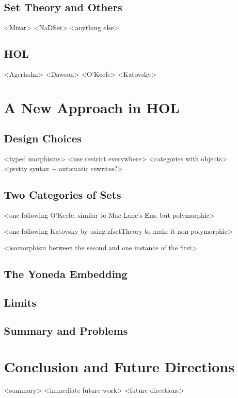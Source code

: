 \documentclass[twoside,titlepage,11pt]{article}
\begin{document}
\subsection{Set Theory and Others}%
  <Mizar>%
  <NaDSet>%
  <anything else>%
\subsection{HOL}%
  <Agerholm>%
  <Dawson>%
  <O'Keefe>%
  <Katovsky>%
\section{A New Approach in HOL}%
\subsection{Design Choices}%
<typed morphisms>
<use restrict everywhere>
<categories with objects>
<pretty syntax + automatic rewrites?>
\subsection{Two Categories of Sets}%
<one following O'Keefe, similar to Mac Lane's Ens, but polymorphic>

<one following Katovsky by using zfsetTheory to make it non-polymorphic>

<isomorphism between the second and one instance of the first>
\subsection{The Yoneda Embedding}%
\subsection{Limits}%
\subsection{Summary and Problems}%
\section{Conclusion and Future Directions}%
<summary>%
<immediate future work>%
<future directions>%


\end{document}
